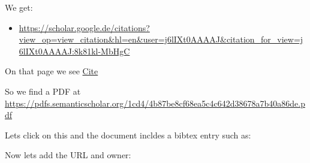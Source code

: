 We get:
\begin{itemize}
\item {} 
\url{https://scholar.google.de/citations?view\_op=view\_citation\&hl=en\&user=j6lIXt0AAAAJ\&citation\_for\_view=j6lIXt0AAAAJ:8k81kl-MbHgC}

\end{itemize}

On that page we see \href{https://scholar.google.com/scholar\_lookup?title=Automated+drug+dispensing+system+reduces+medication+errors+in+an+intensive+care+setting\&author=Chapuis\&publication\_year=2010\#}{Cite}

So we find a PDF at
\url{https://pdfs.semanticscholar.org/1cd4/4b87be8cf68ea5c4c642d38678a7b40a86de.pdf}

Lets click on this and the document incldes a bibtex entry such as:

\begin{sphinxVerbatim}[commandchars=\\\{\}]
       \PYGZbs{}
       
           
                   
    
    
    
\end{sphinxVerbatim}

Now lets add the URL and owner:

